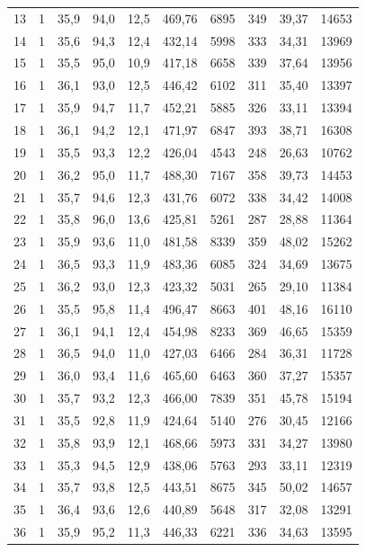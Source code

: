 \documentclass[11pt,a4paper]{article}
\begin{document}
{\begin{longtable}{r c r r r r r r r r}
13 & 1 & 35,9 & 94,0 & 12,5 & 469,76 & 6895 & 349 & 39,37 & 14653 \\
14 & 1 & 35,6 & 94,3 & 12,4 & 432,14 & 5998 & 333 & 34,31 & 13969 \\
15 & 1 & 35,5 & 95,0 & 10,9 & 417,18 & 6658 & 339 & 37,64 & 13956 \\
16 & 1 & 36,1 & 93,0 & 12,5 & 446,42 & 6102 & 311 & 35,40 & 13397 \\
17 & 1 & 35,9 & 94,7 & 11,7 & 452,21 & 5885 & 326 & 33,11 & 13394 \\
18 & 1 & 36,1 & 94,2 & 12,1 & 471,97 & 6847 & 393 & 38,71 & 16308 \\
19 & 1 & 35,5 & 93,3 & 12,2 & 426,04 & 4543 & 248 & 26,63 & 10762 \\
20 & 1 & 36,2 & 95,0 & 11,7 & 488,30 & 7167 & 358 & 39,73 & 14453 \\
21 & 1 & 35,7 & 94,6 & 12,3 & 431,76 & 6072 & 338 & 34,42 & 14008 \\
22 & 1 & 35,8 & 96,0 & 13,6 & 425,81 & 5261 & 287 & 28,88 & 11364 \\
23 & 1 & 35,9 & 93,6 & 11,0 & 481,58 & 8339 & 359 & 48,02 & 15262 \\
24 & 1 & 36,5 & 93,3 & 11,9 & 483,36 & 6085 & 324 & 34,69 & 13675 \\
25 & 1 & 36,2 & 93,0 & 12,3 & 423,32 & 5031 & 265 & 29,10 & 11384 \\
26 & 1 & 35,5 & 95,8 & 11,4 & 496,47 & 8663 & 401 & 48,16 & 16110 \\
27 & 1 & 36,1 & 94,1 & 12,4 & 454,98 & 8233 & 369 & 46,65 & 15359 \\
28 & 1 & 36,5 & 94,0 & 11,0 & 427,03 & 6466 & 284 & 36,31 & 11728 \\
29 & 1 & 36,0 & 93,4 & 11,6 & 465,60 & 6463 & 360 & 37,27 & 15357 \\
30 & 1 & 35,7 & 93,2 & 12,3 & 466,00 & 7839 & 351 & 45,78 & 15194 \\
31 & 1 & 35,5 & 92,8 & 11,9 & 424,64 & 5140 & 276 & 30,45 & 12166 \\
32 & 1 & 35,8 & 93,9 & 12,1 & 468,66 & 5973 & 331 & 34,27 & 13980 \\
33 & 1 & 35,3 & 94,5 & 12,9 & 438,06 & 5763 & 293 & 33,11 & 12319 \\
34 & 1 & 35,7 & 93,8 & 12,5 & 443,51 & 8675 & 345 & 50,02 & 14657 \\
35 & 1 & 36,4 & 93,6 & 12,6 & 440,89 & 5648 & 317 & 32,08 & 13291 \\
36 & 1 & 35,9 & 95,2 & 11,3 & 446,33 & 6221 & 336 & 34,63 & 13595 \\

\end{longtable}}
\end{document}
